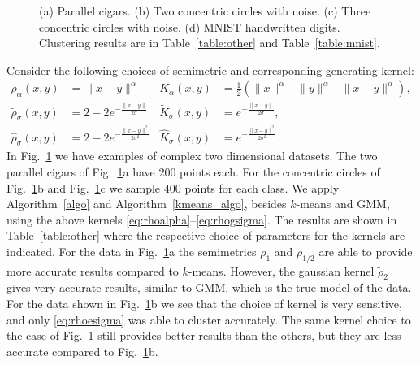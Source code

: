 \documentclass[aps,preprint,nofootinbib,floatfix]{revtex4-1}
\newcommand\kk{K}
\begin{document}
\begin{figure}
\begin{minipage}{0.23\textwidth}
\end{minipage}
\caption{\label{fig:other}
(a) Parallel cigars. (b) Two  
concentric circles with noise. (c) Three
concentric circles with noise. (d) MNIST handwritten digits.
Clustering results are in Table~\ref{table:other}
and Table~\ref{table:mnist}.
}
\end{figure}

Consider the following choices of semimetric and 
corresponding generating kernel:
\begin{align}
\rho_{\alpha}(x,y) &= \| x - y\|^\alpha & 
\kk_{\alpha}(x,y) &= \tfrac{1}{2}\left(
\| x \|^\alpha +
\| y \|^\alpha -
\| x-y \|^\alpha \right) ,
\label{eq:rhoalpha} \\
%
\widetilde{\rho}_{\sigma}(x,y) &= 2 - 2 e^{-\tfrac{\|x-y\|}{2 \sigma}} &
\widetilde{\kk}_{\sigma}(x,y) &= e^{-\tfrac{\|x-y\|}{2\sigma}} ,
\label{eq:rhoesigma} \\
%
\widehat{\rho}_{\sigma}(x,y) &= 2 - 2 e^{-\tfrac{\|x-y\|^2}{2 \sigma^2}} &
\widehat{\kk}_{\sigma}(x,y) &= e^{-\tfrac{\|x-y\|^2}{2\sigma^2}} .
\label{eq:rhogsigma} 
\end{align}
In Fig.~\ref{fig:other} we have examples of
complex two dimensional datasets. The two parallel cigars of 
Fig.~\ref{fig:other}a have $200$ points each. For the concentric circles
of Fig.~\ref{fig:other}b and Fig.~\ref{fig:other}c we
sample $400$ points for each class.
We apply Algorithm~\ref{algo} and Algorithm~\ref{kmeans_algo}, besides
$k$-means and GMM, using the above kernels 
\eqref{eq:rhoalpha}--\eqref{eq:rhogsigma}. The results are shown
in Table~\ref{table:other} where the respective choice of parameters for the
kernels are indicated. For the data in Fig.~\ref{fig:other}a 
the semimetrics $\rho_1$ and $\rho_{1/2}$ are
able to provide more accurate results compared to $k$-means. However,
the gaussian kernel $\widetilde{\rho}_2$ gives very accurate
results, similar to GMM,
which is the true model of the data. For the data shown in
Fig.~\ref{fig:other}b we see
that the choice of kernel is very sensitive, and only \eqref{eq:rhoesigma}
was able to cluster accurately. The same kernel choice to the case
of Fig.~\ref{fig:other} still provides better results than
the others, but they are less accurate compared to Fig.~\ref{fig:other}b.
\end{document}
